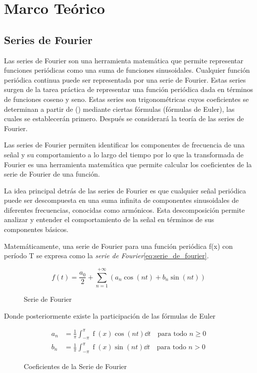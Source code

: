 \section{Marco Teórico }
\subsection{Series de Fourier}

Las series de Fourier son una herramienta matemática que permite representar funciones periódicas como una suma de funciones sinusoidales. Cualquier función periódica continua puede ser representada por una serie de Fourier. Estas series surgen de la tarea práctica de representar una función periódica dada en términos de funciones coseno y seno. Estas series son trigonométricas cuyos coeficientes se determinan a partir de () mediante ciertas fórmulas (fórmulas de Euler), las cuales se establecerán primero. Después se considerará la teoría de las series de Fourier.

Las series de Fourier permiten identificar los componentes de frecuencia de una señal y su comportamiento a lo largo del tiempo por lo que la transformada de Fourier es una herramienta matemática que permite calcular los coeficientes de la serie de Fourier de una función.

La idea principal detrás de las series de Fourier es que cualquier señal periódica puede ser descompuesta en una suma infinita de componentes sinusoidales de diferentes frecuencias, conocidas como armónicos. Esta descomposición permite analizar y entender el comportamiento de la señal en términos de sus componentes básicos.

Matemáticamente, una serie de Fourier para una función periódica f(x) con período T se expresa como la \emph{serie de Fourier}\eqref{eq:serie_de_fourier}.
\begin{figure}[H]
	\begin{equation}
	f(t) = \frac{a_0}{2} + \sum_{n=1}^{+\infty} (a_n \cos(nt) + b_n \sin(nt))	
	\label{eq:serie_de_fourier}
\end{equation}
\caption{Serie de Fourier}
\end{figure}


Donde posteriormente existe la participación de las fórmulas de Euler

\begin{figure}[H]
	\begin{equation}
		\begin{aligned}
			a_n &= \frac{1}{\pi} \int_{-\pi}^{\pi} \operatorname{f}(x) \cos(nt) \dd{t} \quad \text{para todo } n \geq 0 \\
			b_n &= \frac{1}{\pi} \int_{-\pi}^{\pi} \operatorname{f}(x) \sin(nt) \dd{t} \quad \text{para todo } n > 0
		\end{aligned}
		\label{eq:fourier_coeffs}
	\end{equation}
	\caption{Coeficientes de la Serie de Fourier}
\end{figure}

